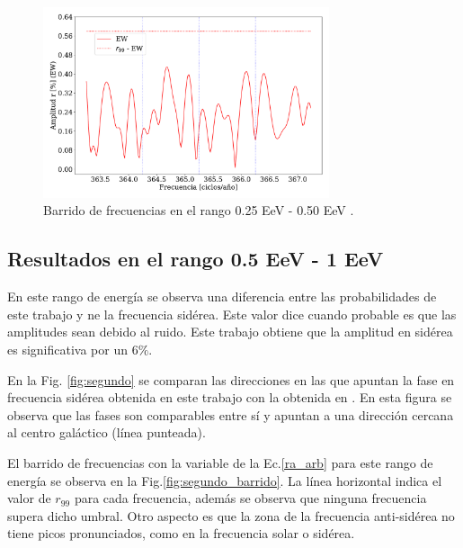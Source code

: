 \begin{figure}[H]
    \begin{small}
        \begin{center}
            \includegraphics[width=0.75\textwidth]{plot_bin_1_barrido_v3_EW.pdf}
        \end{center}
        \caption{Barrido de frecuencias en el  rango 0.25 EeV - 0.50 EeV .}
        \label{fig:primer_barrido}
    \end{small}
\end{figure}

\subsection{Resultados en el rango 0.5 EeV - 1 EeV}
En este rango de energía se observa una diferencia entre las probabilidades de este trabajo y \cite{Aab_2020}  ne la frecuencia sidérea. Este valor dice cuando probable es que las amplitudes sean debido al ruido. Este trabajo obtiene que la amplitud en sidérea es significativa por un  $6\%$.  

En la Fig. \ref{fig:segundo} se comparan las direcciones en las que apuntan la fase en frecuencia sidérea obtenida en este trabajo con la obtenida en \cite{Aab_2020}. En esta figura se observa que las fases son comparables entre sí y apuntan a una dirección cercana al centro galáctico (línea punteada).

El barrido de frecuencias con la variable de la Ec.\ref{ra_arb} para este rango de energía se observa en la Fig.\ref{fig:segundo_barrido}. La línea horizontal indica el valor de $r_{99}$ para cada frecuencia, además se observa que ninguna frecuencia supera dicho umbral. Otro aspecto es que la zona de la frecuencia anti-sidérea no tiene picos pronunciados, como en la frecuencia solar o sidérea.

